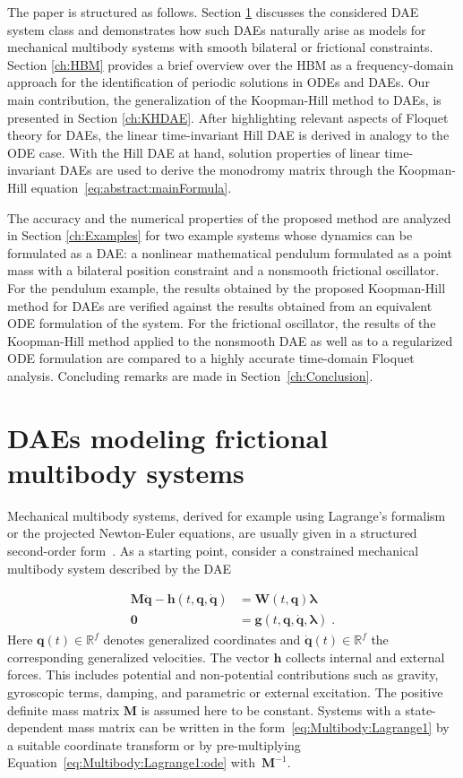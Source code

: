 \documentclass[a4paper, nonatbib, 3p, twocolumn]{elsarticle}
\theoremstyle{plain}
\theoremstyle{definition}
\theoremstyle{remark}
\newcommand{\vzero}{\mathbf{0}}
\newcommand{\Rspace}{\mathbb{R}}
\newcommand{\vla}{\bm{\lambda}}
\newcommand{\vg}{\mathbf g}
\newcommand{\vh}{\mathbf h}
\newcommand{\vq}{\mathbf q}
\newcommand{\vM}{\mathbf M}
\newcommand{\vW}{\mathbf W}
\begin{document}
The paper is structured as follows. Section \ref{ch:Multibody} discusses the considered DAE system class and demonstrates how such DAEs naturally arise as models for mechanical multibody systems with smooth bilateral or frictional constraints.  
Section \ref{ch:HBM} provides a brief overview over the HBM as a frequency-domain approach for the identification of periodic solutions in ODEs and DAEs. Our main contribution, the generalization of the Koopman-Hill method to DAEs, is presented in Section \ref{ch:KHDAE}. After highlighting relevant aspects of Floquet theory for DAEs, the linear time-invariant Hill DAE is derived in analogy to the ODE case. With the Hill DAE at hand, solution properties of linear time-invariant DAEs are used to derive the monodromy matrix through the Koopman-Hill equation~\eqref{eq:abstract:mainFormula}. 

The accuracy and the numerical properties of the proposed method are analyzed in Section \ref{ch:Examples} for two example systems whose dynamics can be formulated as a DAE: a nonlinear mathematical pendulum formulated as a point mass with a bilateral position constraint and a nonsmooth frictional oscillator. For the pendulum example, the results obtained by the proposed Koopman-Hill method for DAEs are verified against the results obtained from an equivalent ODE formulation of the system. For the frictional oscillator, the results of the Koopman-Hill method applied to the nonsmooth DAE as well as to a regularized ODE formulation are compared to a highly accurate time-domain Floquet analysis. Concluding remarks are made in Section~\ref{ch:Conclusion}.


\section{DAEs modeling frictional multibody systems}\label{ch:Multibody}

Mechanical multibody systems, derived for example using Lagrange's formalism or the projected Newton-Euler equations, are usually given in a structured second-order form~\cite{GarciadeJalon1994}.
As a starting point, consider a constrained mechanical multibody system described by the DAE

\begin{subequations}\label{eq:Multibody:Lagrange1}
\begin{align}
    \vM\ddot{\vq}-\vh(t,\vq, \dot{\vq}) &= \vW(t, \vq)\vla  \label{eq:Multibody:Lagrange1:ode} \\
    \vzero &= \vg(t, \vq, \dot{\vq}, \vla) \;.
\end{align}
\end{subequations}
Here $\vq(t) \in \Rspace^f$ denotes generalized coordinates and $\dot{\vq}(t) \in \Rspace^f$ the corresponding generalized velocities.
The vector $\vh$ collects internal and external forces. This includes potential and non-potential contributions such as gravity, gyroscopic terms, damping, and parametric or external excitation. 
The positive definite mass matrix $\vM$ is assumed here to be constant. Systems with a state-dependent mass matrix can be written in the form~\eqref{eq:Multibody:Lagrange1} by a suitable coordinate transform or by pre-multiplying Equation~\eqref{eq:Multibody:Lagrange1:ode} with~$\vM^{-1}$.
\end{document}
